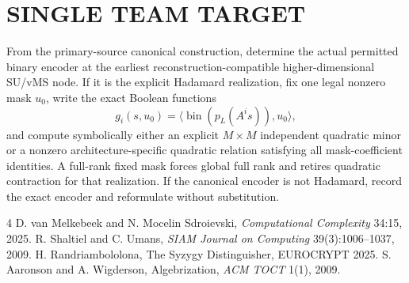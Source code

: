 \documentclass[11pt]{article}
\begin{document}
\section*{SINGLE TEAM TARGET}
From the primary-source canonical construction, determine the actual permitted binary encoder at the earliest reconstruction-compatible higher-dimensional SU/vMS node. If it is the explicit Hadamard realization, fix one legal nonzero mask $u_0$, write the exact Boolean functions
\[
\boxed{g_i(s,u_0)=\langle\operatorname{bin}(p_L(A^is)),u_0\rangle},
\]
and compute symbolically either an explicit $M\times M$ independent quadratic minor or a nonzero architecture-specific quadratic relation satisfying all mask-coefficient identities. A full-rank fixed mask forces global full rank and retires quadratic contraction for that realization. If the canonical encoder is not Hadamard, record the exact encoder and reformulate without substitution.

\begin{thebibliography}{4}
 D. van Melkebeek and N. Mocelin Sdroievski, \emph{Computational Complexity} 34:15, 2025.
 R. Shaltiel and C. Umans, \emph{SIAM Journal on Computing} 39(3):1006--1037, 2009.
 H. Randriambololona, The Syzygy Distinguisher, EUROCRYPT 2025.
 S. Aaronson and A. Wigderson, Algebrization, \emph{ACM TOCT} 1(1), 2009.
\end{thebibliography}
\end{document}
